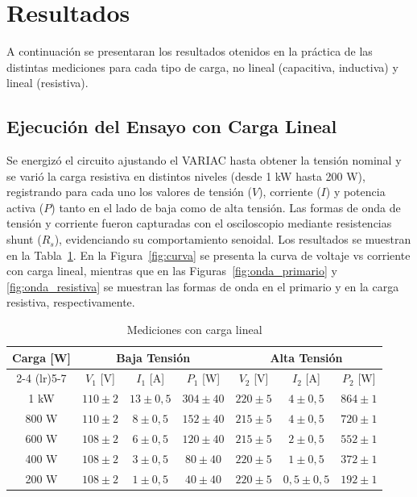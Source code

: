 \section{Resultados}
A continuación se presentaran los resultados otenidos en la práctica de las distintas mediciones para cada tipo de carga, no lineal (capacitiva, inductiva) y lineal (resistiva).

\subsection{Ejecución del Ensayo con Carga Lineal}

Se energizó el circuito ajustando el VARIAC hasta obtener la tensión nominal y se varió la carga resistiva en distintos niveles (desde 1 kW hasta 200 W), registrando para cada uno los valores de tensión ($V$), corriente ($I$) y potencia activa ($P$) tanto en el lado de baja como de alta tensión. Las formas de onda de tensión y corriente fueron capturadas con el osciloscopio mediante resistencias shunt ($R_s$), evidenciando su comportamiento senoidal. Los resultados se muestran en la Tabla~\ref{tab:resultados_transformador}. En la Figura~\ref{fig:curva} se presenta la curva de voltaje vs corriente con carga lineal, mientras que en las Figuras~\ref{fig:onda_primario} y \ref{fig:onda_resistiva} se muestran las formas de onda en el primario y en la carga resistiva, respectivamente.

\begin{table}[H]
    \centering
    \caption{Mediciones con carga lineal}
    \label{tab:resultados_transformador}
    \begin{tabular}{ccccccc}
        \toprule
        \textbf{Carga [W]} & \multicolumn{3}{c}{\textbf{Baja Tensión}} & \multicolumn{3}{c}{\textbf{Alta Tensión}} \\
        \cmidrule(lr){2-4} \cmidrule(lr){5-7}
        & $V_1$ [V] & $I_1$ [A] & $P_1$ [W] & $V_2$ [V] & $I_2$ [A] & $P_2$ [W] \\
        \midrule
        1 kW  & $110 \pm 2$ & $13 \pm 0,5$ & $304 \pm 40$ & $220 \pm 5$ & $4 \pm 0,5$   & $864 \pm 1$ \\
        800 W & $110 \pm 2$ & $8 \pm 0,5$  & $152 \pm 40$ & $215 \pm 5$ & $4 \pm 0,5$   & $720 \pm 1$ \\
        600 W & $108 \pm 2$ & $6 \pm 0,5$  & $120 \pm 40$ & $215 \pm 5$ & $2 \pm 0,5$   & $552 \pm 1$ \\
        400 W & $108 \pm 2$ & $3 \pm 0,5$  & $80 \pm 40$  & $220 \pm 5$ & $1 \pm 0,5$   & $372 \pm 1$ \\
        200 W & $108 \pm 2$ & $1 \pm 0,5$  & $40 \pm 40$  & $220 \pm 5$ & $0,5 \pm 0,5$ & $192 \pm 1$ \\
        \bottomrule
    \end{tabular}
\end{table}

